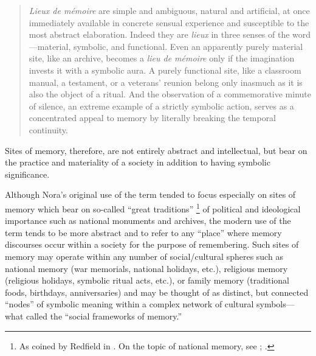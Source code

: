 \begin{quote}
    \emph{Lieux de mémoire} are simple and ambiguous, natural and artificial, at once immediately available in concrete sensual experience and susceptible to the most abstract elaboration. Indeed they are \emph{lieux} in three senses of the word---material, symbolic, and functional. Even an apparently purely material site, like an archive, becomes a \emph{lieu de mémoire} only if the imagination invests it with a symbolic aura. A purely functional site, like a classroom manual, a testament, or a veterans' reunion belong only inasmuch as it is also the object of a ritual. And the observation of a commemorative minute of silence, an extreme example of a strictly symbolic action, serves as a concentrated appeal to memory by literally breaking the temporal continuity.%
        \autocite[18--19]{nora_representations1989}
\end{quote}

\noindent
Sites of memory, therefore, are not entirely abstract and intellectual, but bear on the practice and materiality of a society in addition to having symbolic significance.

Although Nora's original use of the term tended to focus especially on sites of memory which bear on so-called ``great traditions''%
    \footnote{%
        As coined by Redfield in 
        \cite*[41--42]{redfield1956}.
        On the topic of national memory, see
        \cite{carretero-alphen_wagoner2017};
        \cite{wertsch_wagoner2017}.}
of political and ideological importance such as national monuments and archives, the modern use of the term tends to be more abstract and to refer to any ``place'' where memory discourses occur within a society for the purpose of remembering. Such sites of memory may operate within any number of social/cultural spheres such as national memory (war memorials, national holidays, etc.), religious memory (religious holidays, symbolic ritual acts, etc.), or family memory (traditional foods, birthdays, anniversaries) and may be thought of as distinct, but connected ``nodes'' of symbolic meaning within a complex network of cultural symbols---what \halbwachs called the ``social frameworks of memory.''%
    \autocite[38]{halbwachs1992}  

